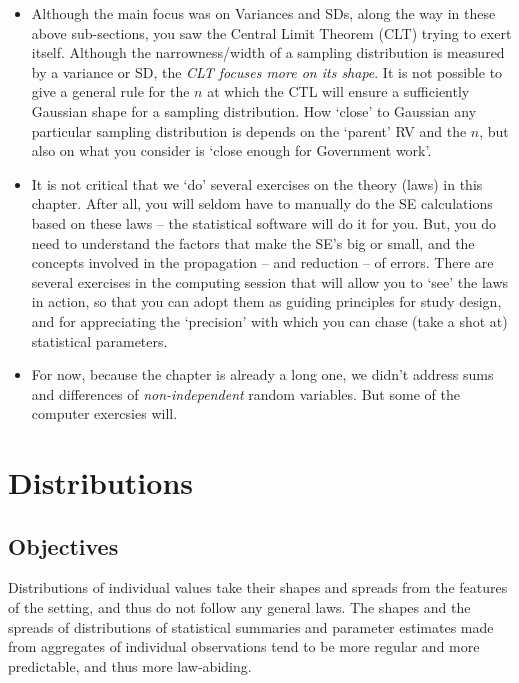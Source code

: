 \documentclass[]{book}
\begin{document}
\begin{itemize}
\item
  Although the main focus was on Variances and SDs, along the way in these above sub-sections, you saw the Central Limit Theorem (CLT) trying to exert itself. Although the narrowness/width of a sampling distribution is measured by a variance or SD, the \emph{CLT focuses more on its shape}. It is not possible to give a general rule for the \(n\) at which the CTL will ensure a sufficiently Gaussian shape for a sampling distribution. How `close' to Gaussian any particular sampling distribution is depends on the `parent' RV and the \(n\), but also on what you consider is `close enough for Government work'.
\item
  It is not critical that we `do' several exercises on the theory (laws) in this chapter. After all, you will seldom have to manually do the SE calculations based on these laws -- the statistical software will do it for you. But, you do need to understand the factors that make the SE's big or small, and the concepts involved in the propagation -- and reduction -- of errors. There are several exercises in the computing session that will allow you to `see' the laws in action, so that you can adopt them as guiding principles for study design, and for appreciating the `precision' with which you can chase (take a shot at) statistical parameters.
\item
  For now, because the chapter is already a long one, we didn't address sums and differences of \emph{non-independent} random variables. But some of the computer exercsies will.
\end{itemize}

\hypertarget{distributions}{%
\chapter{Distributions}\label{distributions}}

\hypertarget{objectives-2}{%
\section{Objectives}\label{objectives-2}}

Distributions of individual values take their shapes and spreads from the features of the setting, and thus do not follow any general laws. The shapes and the spreads of distributions of statistical summaries and parameter estimates made from aggregates of individual observations tend to be more regular and more predictable, and thus more law-abiding.
\end{document}
